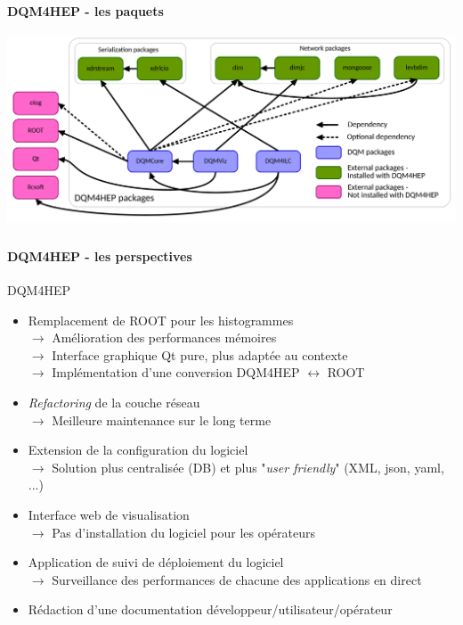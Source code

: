 \documentclass[8pt]{beamer}
\begin{document}
  \begin{frame}
  \frametitle{\backup}
  \framesubtitle{DQM4HEP - les paquets}
    \begin{center}
      \includegraphics[width=\linewidth]{PackagesDiagram.pdf}
    \end{center}
  \end{frame}


  \begin{frame}
  \frametitle{\backup}
  \framesubtitle{DQM4HEP - les perspectives}
    \begin{block}{DQM4HEP}
      \begin{itemize}
        \item Remplacement de ROOT pour les histogrammes \\
        $\rightarrow$ Amélioration des performances mémoires \\
        $\rightarrow$ Interface graphique Qt pure, plus adaptée au contexte \\
        $\rightarrow$ Implémentation d'une conversion DQM4HEP $\leftrightarrow$ ROOT
        \item \textit{Refactoring} de la couche réseau \\
        $\rightarrow$ Meilleure maintenance sur le long terme
        \item Extension de la configuration du logiciel \\
        $\rightarrow$ Solution plus centralisée (DB) et plus "\textit{user friendly}" (XML, json, yaml, ...)
        \item Interface web de visualisation \\
        $\rightarrow$ Pas d'installation du logiciel pour les opérateurs
        \item Application de suivi de déploiement du logiciel \\
        $\rightarrow$ Surveillance des performances de chacune des applications en direct
        \item Rédaction d'une documentation développeur/utilisateur/opérateur
      \end{itemize}
    \end{block}
  \end{frame}

\end{document}
